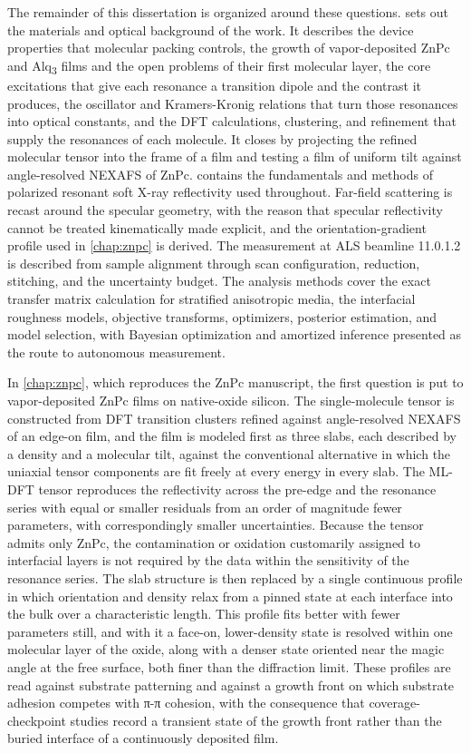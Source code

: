 The remainder of this dissertation is organized around these questions.  sets out the materials and optical background of the work. It describes the device properties that molecular packing controls, the growth of vapor-deposited ZnPc and Alq\textsubscript{3} films and the open problems of their first molecular layer, the core excitations that give each resonance a transition dipole and the contrast it produces, the oscillator and Kramers-Kronig relations that turn those resonances into optical constants, and the DFT calculations, clustering, and refinement that supply the resonances of each molecule. It closes by projecting the refined molecular tensor into the frame of a film and testing a film of uniform tilt against angle-resolved NEXAFS of ZnPc.  contains the fundamentals and methods of polarized resonant soft X-ray reflectivity used throughout. Far-field scattering is recast around the specular geometry, with the reason that specular reflectivity cannot be treated kinematically made explicit, and the orientation-gradient profile used in \cref{chap:znpc} is derived. The measurement at ALS beamline 11.0.1.2 is described from sample alignment through scan configuration, reduction, stitching, and the uncertainty budget. The analysis methods cover the exact transfer matrix calculation for stratified anisotropic media, the interfacial roughness models, objective transforms, optimizers, posterior estimation, and model selection, with Bayesian optimization and amortized inference presented as the route to autonomous measurement.

In \cref{chap:znpc}, which reproduces the ZnPc manuscript, the first question is put to vapor-deposited ZnPc films on native-oxide silicon. The single-molecule tensor is constructed from DFT transition clusters refined against angle-resolved NEXAFS of an edge-on film, and the film is modeled first as three slabs, each described by a density and a molecular tilt, against the conventional alternative in which the uniaxial tensor components are fit freely at every energy in every slab. The ML-DFT tensor reproduces the reflectivity across the pre-edge and the resonance series with equal or smaller residuals from an order of magnitude fewer parameters, with correspondingly smaller uncertainties. Because the tensor admits only ZnPc, the contamination or oxidation customarily assigned to interfacial layers is not required by the data within the sensitivity of the resonance series. The slab structure is then replaced by a single continuous profile in which orientation and density relax from a pinned state at each interface into the bulk over a characteristic length. This profile fits better with fewer parameters still, and with it a face-on, lower-density state is resolved within one molecular layer of the oxide, along with a denser state oriented near the magic angle at the free surface, both finer than the diffraction limit. These profiles are read against substrate patterning and against a growth front on which substrate adhesion competes with π-π cohesion, with the consequence that coverage-checkpoint studies record a transient state of the growth front rather than the buried interface of a continuously deposited film.

